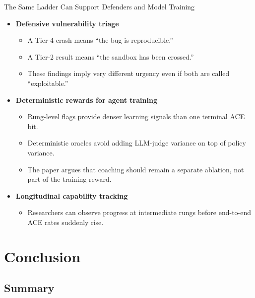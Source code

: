 \documentclass[aspectratio=169,t]{beamer}
\begin{document}
\begin{frame}{The Same Ladder Can Support Defenders and Model Training}
  \begin{itemize}
    \item \textbf{Defensive vulnerability triage}
      \begin{itemize}
        \item A Tier-4 crash means “the bug is reproducible.”
        \item A Tier-2 result means “the sandbox has been crossed.”
        \item These findings imply very different urgency even if both are called “exploitable.”
      \end{itemize}
    \item \textbf{Deterministic rewards for agent training}
      \begin{itemize}
        \item Rung-level flags provide denser learning signals than one terminal ACE bit.
        \item Deterministic oracles avoid adding LLM-judge variance on top of policy variance.
        \item The paper argues that coaching should remain a separate ablation, not part of the training reward.
      \end{itemize}
    \item \textbf{Longitudinal capability tracking}
      \begin{itemize}
        \item Researchers can observe progress at intermediate rungs before end-to-end ACE rates suddenly rise.
      \end{itemize}
  \end{itemize}
\end{frame}

\section{Conclusion}
\subsection{Summary}
\end{document}
